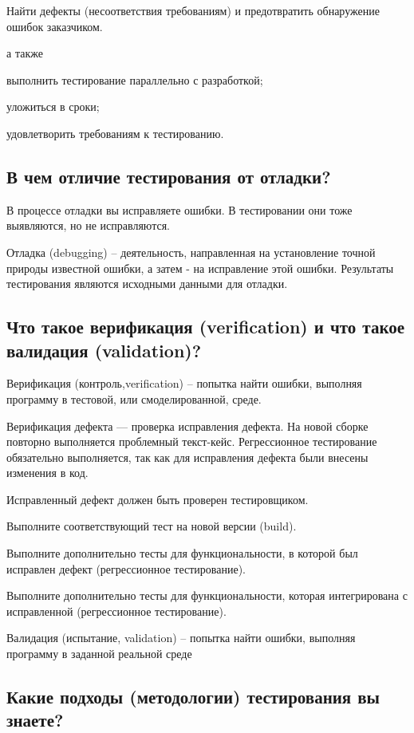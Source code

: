 Найти дефекты (несоответствия требованиям) и предотвратить обнаружение ошибок
заказчиком.

а также 

выполнить тестирование параллельно с разработкой;

уложиться в сроки;

удовлетворить требованиям к тестированию.


\subsection{В чем отличие тестирования от отладки?}

В процессе отладки вы исправляете ошибки. В тестировании они тоже выявляются,
но не исправляются.

Отладка (debugging) – деятельность, направленная на установление точной природы
известной ошибки, а затем - на исправление этой ошибки. Результаты тестирования
являются исходными данными для отладки.

\subsection{Что такое верификация (verification) и что такое валидация
(validation)?}

Верификация (контроль,verification) – попытка найти ошибки, выполняя программу
в тестовой, или смоделированной, среде.

Верификация дефекта --- проверка исправления дефекта. На новой сборке повторно
выполняется проблемный текст-кейс. Регрессионное тестирование обязательно
выполняется, так как для исправления дефекта были внесены изменения в код.

Исправленный дефект должен быть проверен тестировщиком.

Выполните соответствующий тест на новой версии (build).

Выполните дополнительно тесты для функциональности, в которой был исправлен
дефект (регрессионное тестирование).

Выполните дополнительно тесты для функциональности, которая интегрирована с
исправленной (регрессионное тестирование).

Валидация (испытание, validation) – попытка найти ошибки, выполняя программу в
заданной реальной среде

\subsection{Какие подходы (методологии) тестирования вы знаете?}

